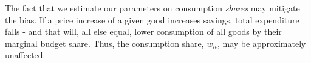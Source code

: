 The fact that we estimate our parameters on consumption \textit{shares} may mitigate the bias. If a price increase of a given good increases savings, total expenditure falls - and that will, all else equal, lower consumption of all goods by their marginal budget share. Thus, the consumption share, $w_{it}$, may be approximately unaffected. 
